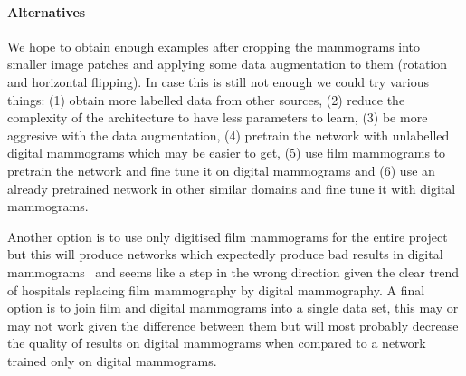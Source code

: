 \documentclass[11pt]{article}
\begin{document}
\paragraph{Alternatives}
We hope to obtain enough examples after cropping the mammograms into smaller image patches and applying some data augmentation to them (rotation and horizontal flipping). In case this is still not enough we could try various things: (1) obtain more labelled data from other sources, (2) reduce the complexity of the architecture to have less parameters to learn, (3) be more aggresive with the data augmentation, (4) pretrain the network with unlabelled digital mammograms which may be easier to get, (5) use film mammograms to pretrain the network and fine tune it on digital mammograms and (6) use an already pretrained network in other similar domains and fine tune it with digital mammograms.

Another option is to use only digitised film mammograms for the entire project but this will produce networks which expectedly produce bad results in digital mammograms~\cite{Zheng2012} and seems like a step in the wrong direction given the clear trend of hospitals replacing film mammography by digital mammography. A final option is to join film and digital mammograms into a single data set, this may or may not work given the difference between them but will most probably decrease the quality of results on digital mammograms when compared to a network trained only on digital mammograms.

\begin{comment}
Film Mammograms 
MIAS, DDSM, BancoWeb, CALMA, AMDI, B-screen, MiRAcle, BCDR-FM
inBeast paper has a good summary.

Digital 
INBreast, MIDAS (no labels), BCDR-DM

Zheng2012 also says that "direct application of an SFM image-based CAD scheme to the FFDM images resulted in the substantial degradation of performance" "digitised image-based CAD can be converted for FFDMs while performing at a comparable, or better, level" "This is largely due to better contrast resolution, detection quantum efficiency and system linearity." He means converted as in retrained, though. (the ANN is completely retrained but it has little params)

Guys from Tabasco:
Canul-Reich, J., Gutiérrez Méndez, O.T. A new collection of preprocessed digital mammograms (2013) Lecture Notes in Computer Science (including subseries Lecture Notes in Artificial Intelligence and Lecture Notes in Bioinformatics), 8265 LNAI (PART 1), pp. 570-581. 
Don't think they have labels

Benchmarking datasets:
Moura, D.C., Loṕez, M.A.G., Cunha, P., De Posada, N.G., Pollan, R.R., Ramos, I., Loureiro, J.P., Moreira, I.C., De Araújo, B.M.F., Fernandes, T.C. Benchmarking datasets for breast cancer computer-aided diagnosis (CADx) (2013) Lecture Notes in Computer Science (including subseries Lecture Notes in Artificial Intelligence and Lecture Notes in Bioinformatics), 8258 LNCS (PART 1), pp. 326-333. 
show that 'this combination of clinical data and image descriptors is advantageous in most CADx scenarios.'
\end{comment}
\end{document}
